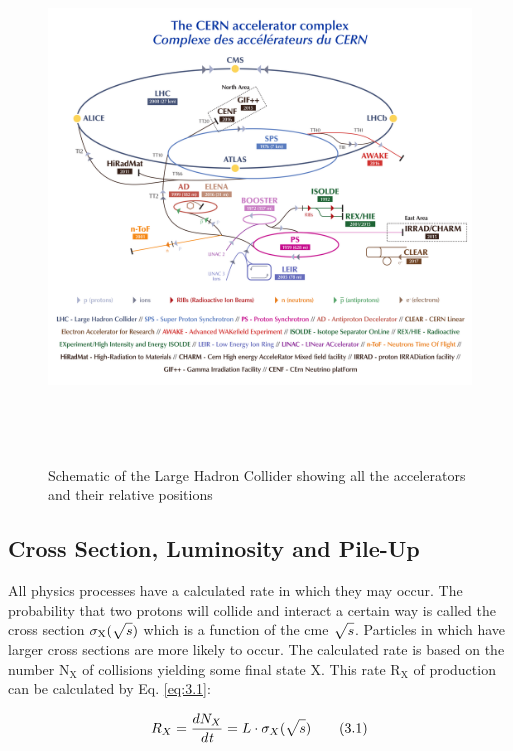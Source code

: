 \begin{figure}[h]
  \centering
  \includegraphics[width=14cm, height=14cm]{figs/ch3/CERN-complex.pdf}
  \caption{Schematic of the Large Hadron Collider \cite{LHC} showing all the accelerators and their 
  relative positions}
\label{fig:3.1}
\end{figure}

\subsection{Cross Section, Luminosity and Pile-Up}

All physics processes have a calculated rate in which they may occur. The probability that 
two protons will collide and interact a certain way is called the cross section $\sigma_{\textrm{X}}(\sqrt{\mathstrut{s}})$ 
which is a function of the \gls{cme} $\sqrt{\mathstrut{s}}$. Particles in which have larger cross 
sections are more likely to occur. The calculated rate is based on the number $\textrm{N}_{\textrm{X}}$ of collisions 
yielding some final state $\textrm{X}$. This rate $\textrm{R}_{\textrm{X}}$ of production can be calculated by Eq. \ref{eq:3.1}:

\begin{equation}\label{eq:3.1}
  R_{X} = \frac{dN_{X}}{d\textit{t}} = L \cdot \sigma_{X}(\sqrt{\mathstrut{s}})
\tag{3.1}
\end{equation}

